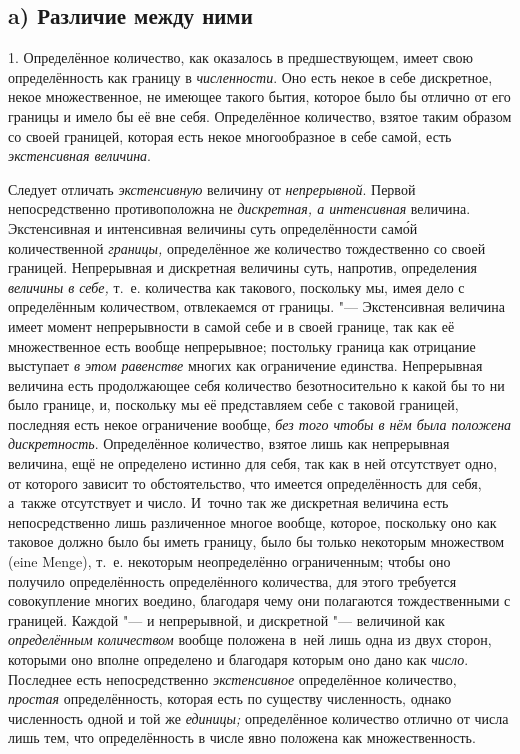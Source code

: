 
\subsection[a) Различие между ними]{a) Различие между ними}

1. Определённое количество, как оказалось в предшествующем, имеет свою
определённость как границу в {\em численности}. Оно есть некое в себе дискретное,
некое множественное, не имеющее такого бытия, которое было бы отлично от его
границы и имело бы её вне себя. Определённое количество, взятое таким образом
со своей границей, которая есть некое многообразное в себе самой, есть
{\em экстенсивная величина}.

Следует отличать {\em экстенсивную} величину от {\em непрерывной}. Первой
непосредственно противоположна не {\em дискретная, а интенсивная}
величина. Экстенсивная и интенсивная величины суть определённости сам\'{о}й
количественной {\em границы,} определённое же количество тождественно со своей
границей. Непрерывная и дискретная величины суть, напротив, определения
{\em величины в себе,} т.~е. количества как такового, поскольку мы, имея дело
с определённым количеством, отвлекаемся от границы. "--- Экстенсивная величина
имеет момент непрерывности в самой себе и в своей границе, так как её
множественное есть вообще непрерывное; постольку граница как отрицание
выступает {\em в этом равенстве} многих как ограничение единства. Непрерывная
величина есть продолжающее себя количество безотносительно к какой бы то ни
было границе, и, поскольку мы её представляем себе с таковой границей,
последняя есть некое ограничение вообще, {\em без того чтобы в нём была
положена дискретность}. Определённое количество, взятое лишь как непрерывная
величина, ещё не определено истинно для себя, так как в ней отсутствует одно,
от которого зависит то обстоятельство, что имеется определённость для себя,
а~также отсутствует и число. И~точно так же дискретная величина есть
непосредственно лишь различенное многое вообще, которое, поскольку оно как
таковое должно было бы иметь границу, было бы только некоторым множеством (eine
Men\-ge), т.~е. некоторым неопределённо ограниченным; чтобы оно получило
определённость определённого количества, для этого требуется совокупление
многих воедино, благодаря чему они полагаются тождественными с границей.
Каждой "--- и непрерывной, и дискретной "--- величиной как
{\em определённым количеством} вообще положена в~ней лишь одна из двух сторон,
которыми оно вполне определено и благодаря которым оно дано
как {\em число}. Последнее
есть непосредственно {\em экстенсивное} определённое количество, {\em простая}
определённость, которая есть по существу численность, однако численность одной
и той же {\em единицы;} определённое количество отлично от числа лишь тем, что определённость
в числе явно положена как множественность.

